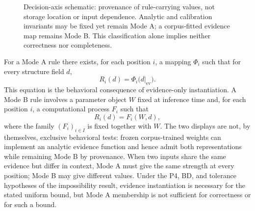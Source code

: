 \documentclass[twoside,11pt]{article}
\newcommand{\ev}{\mathrm{ev}}
\begin{document}
\begin{figure}[t]
\centering
\small
{}
\caption{Decision-axis schematic: provenance of rule-carrying values, not storage location or input dependence. Analytic and calibration invariants may be fixed yet remain Mode A; a corpus-fitted evidence map remains Mode B. This classification alone implies neither correctness nor completeness.}
\label{fig:decision-axis}
\end{figure}

For a Mode A rule there exists, for each position $i$, a mapping $\Phi_i$ such that for every structure field $d$,
\begin{equation}
R_i(d) = \Phi_i\bigl(d|_{\ev}\bigr).
\label{eq:modeA}%
\end{equation}%
This equation is the behavioral consequence of evidence-only instantiation. A Mode B rule involves a parameter object $W$ fixed at inference time and, for each position $i$, a computational process $F_i$ such that
\begin{equation}
R_i(d) = F_i(W, d),
\label{eq:modeB}%
\end{equation}%
where the family $(F_i)_{i \in I}$ is fixed together with $W$. The two displays are not, by themselves, exclusive behavioral tests: frozen corpus-trained weights can implement an analytic evidence function and hence admit both representations while remaining Mode B by provenance. When two inputs share the same evidence but differ in context, Mode A must give the same strength at every position; Mode B may give different values. Under the P4, BD, and tolerance hypotheses of the impossibility result, evidence instantiation is necessary for the stated uniform bound, but Mode A membership is not sufficient for correctness or for such a bound.
\end{document}
